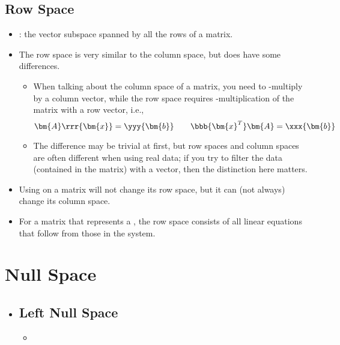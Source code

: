 \begin{itemize}
  \subsection{Row Space}\label{Row Space}
  \begin{itemize}
    \item {}: the vector subspace spanned by all the rows of a matrix. 
    \item The row space is very similar to the column space, but does have some differences.
      \begin{itemize}
        \item When talking about the column space of a matrix, you need to -multiply by a column vector, while the row space requires -multiplication of the matrix with a row vector, i.e.,
        \[%
        \bm{A}\rrr{\bm{x}}=\yyy{\bm{b}} \qquad \bbb{\bm{x}^T}\bm{A}=\xxx{\bm{b}}
        \]%
        \item The difference may be trivial at first, but row spaces and column spaces are often different when using real data; if you try to filter the data (contained in the matrix) with a vector, then the distinction here matters.
      \end{itemize}
    \item Using \hyperref[Row Echelon form]{} on a matrix will not change its row space, but it can (not always) change its column space.
    \item For a matrix that represents a \hyperref[Homogeneous Solution Sets]{}, the row space consists of all linear equations that follow from those in the system. 
  \end{itemize}  
\end{itemize}

\section{Null Space}\label{Null Space}
\begin{itemize}
  \item []
  
  \subsection{Left Null Space}\label{Left Null Space}
  \begin{itemize}
    \item 
    
  \end{itemize}
\end{itemize}

